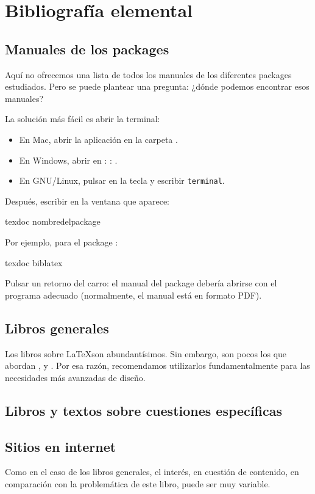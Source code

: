 \chapter{Bibliografía elemental}

\nocite{*}
\section{Manuales de los packages \label{manuels}}


Aquí no ofrecemos una lista de todos los manuales de los diferentes packages estudiados. Pero se puede plantear una pregunta: ¿dónde podemos encontrar esos manuales?

La solución más fácil es abrir la terminal:
\begin{itemize}
\item En Mac, abrir la aplicación  en la carpeta .
\item En Windows, abrir  en : : .
\item En GNU/Linux, pulsar en la tecla  y escribir \verb|terminal|.
\end{itemize}

Después, escribir en la ventana que aparece:

\begin{bashcode}
texdoc nombredelpackage
\end{bashcode}

Por ejemplo, para el package :

\begin{bashcode}
texdoc biblatex
\end{bashcode}

Pulsar un retorno del carro: el manual del package debería abrirse con el programa adecuado (normalmente, el manual está en formato PDF).

\section{Libros generales}

Los libros sobre \LaTeX son abundantísimos. Sin embargo, son pocos los que abordan \XeLaTeX,   y  . Por esa razón, recomendamos utilizarlos fundamentalmente para las necesidades más avanzadas de diseño.

\printbibliography[keyword=generaliste]

\section{Libros y textos sobre cuestiones específicas}

\printbibliography[keyword=specifique]


\section{Sitios en internet}

Como en el caso de los libros generales, el interés, en cuestión de contenido, en comparación con la problemática de este libro, puede ser muy variable. 

\printbibliography[keyword=site]
